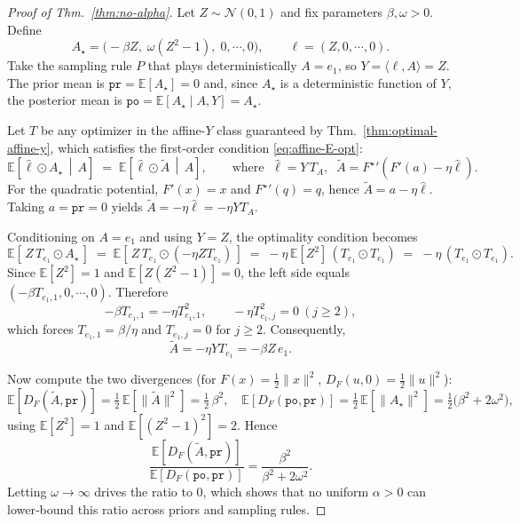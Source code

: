 \documentclass{article}
\theoremstyle{plain}
\theoremstyle{definition}
\newcommand{\pr}{\texttt{pr}}
\newcommand{\po}{\texttt{po}}
\newcommand{\cN}{\mathcal{N}}
\newcommand{\E}{\mathbb E}
\newcommand{\hl}{\hat{\ell}\xspace}
\begin{document}
\begin{proof}[Proof of Thm.~\ref{thm:no-alpha}]
    Let $Z\sim\cN(0,1)$ and fix parameters $\beta,\omega>0$. Define
    \[
        A_\star = \big(-\beta Z,\;\omega(Z^2-1),\;0,\cdots,0\big),\qquad
        \ell = (Z,0,\cdots,0).
    \]
    Take the sampling rule $P$ that plays deterministically $A=e_1$, so
    $Y=\langle \ell, A\rangle = Z$. The prior mean is $\pr=\E[A_\star]=0$ and,
    since $A_\star$ is a deterministic function of $Y$, the posterior mean is
    \(
    \po=\E[A_\star\mid A,Y]=A_\star.
    \)

    Let $T$ be any optimizer in the affine-$Y$ class guaranteed by
    Thm.~\ref{thm:optimal-affine-y}, which satisfies the first‑order condition
    \eqref{eq:affine-E-opt}:
    \[
        \E\!\left[\hl\odot A_\star \,\middle|\, A\right]
        \;=\;
        \E\!\left[\hl\odot \tilde{A} \,\middle|\, A\right],
        \qquad \text{where }\;\hl=Y\,T_A,\;\;
        \tilde{A}={F^\star}'\!\left(F'(a)-\eta\hl\right).
    \]
    For the quadratic potential, $F'(x)=x$ and ${F^\star}'(q)=q$, hence
    $\tilde{A}=a-\eta\hl$. Taking $a=\pr=0$ yields $\tilde{A}=-\eta\hl=-\eta Y T_A$.

    Conditioning on $A=e_1$ and using $Y=Z$, the optimality condition becomes
    \[
        \E\!\left[\, Z\,T_{e_1}\odot A_\star\,\right]
        \;=\;
        \E\!\left[\, Z\,T_{e_1}\odot(-\eta Z T_{e_1})\,\right]
        \;=\;
        -\eta\,\E[Z^2]\,(T_{e_1}\odot T_{e_1})
        \;=\;
        -\eta\,(T_{e_1}\odot T_{e_1}).
    \]
    Since $\E[Z^2]=1$ and $\E[Z(Z^2-1)]=0$, the left side equals
    $(-\beta T_{e_1,1},0,\cdots,0)$. Therefore
    \[
        -\beta T_{e_1,1}=-\eta T_{e_1,1}^2,\qquad
        -\eta T_{e_1,j}^2=0\ (j\ge 2),
    \]
    which forces $T_{e_1,1}=\beta/\eta$ and $T_{e_1,j}=0$ for $j\ge 2$. Consequently,
    \[
        \tilde{A}=-\eta Y T_{e_1}=-\beta Z\,e_1.
    \]

    Now compute the two divergences (for $F(x)=\tfrac12\|x\|^2$, $D_F(u,0)=\tfrac12\|u\|^2$):
    \[
        \E\!\left[D_F(\tilde{A},\pr)\right]
        =\tfrac12\,\E\!\left[\|\tilde{A}\|^2\right]
        =\tfrac12\,\beta^2,
        \quad
        \E\!\left[D_F(\po,\pr)\right]
        =\tfrac12\,\E\!\left[\|A_\star\|^2\right]
        =\tfrac12\big(\beta^2+2\omega^2\big),
    \]
    using $\E[Z^2]=1$ and $\E[(Z^2-1)^2]=2$. Hence
    \[
        \frac{\E[D_F(\tilde{A},\pr)]}{\E[D_F(\po,\pr)]}
        =\frac{\beta^2}{\beta^2+2\omega^2}.
    \]
    Letting $\omega\to\infty$ drives the ratio to $0$, which shows that no uniform
    $\alpha>0$ can lower‑bound this ratio across priors and sampling rules.
\end{proof}

% 
\end{document}
